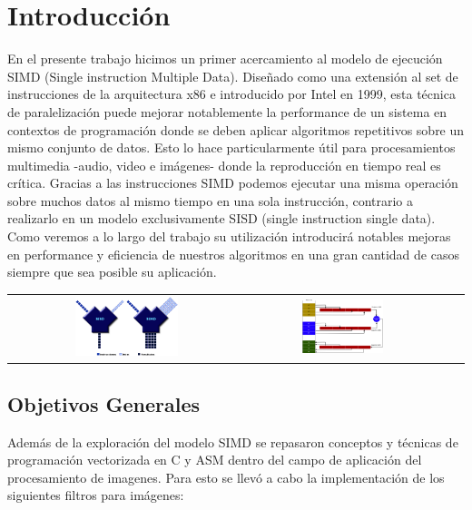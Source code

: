 \section{Introducción}
En el presente trabajo hicimos un primer acercamiento al modelo de ejecución SIMD (Single instruction Multiple Data). Diseñado como una extensión al set de instrucciones de la arquitectura x86 e introducido por Intel en 1999, esta técnica de paralelización puede mejorar notablemente la performance de un sistema en contextos de programación donde se deben aplicar algoritmos repetitivos sobre un mismo conjunto de datos. Esto lo hace particularmente útil para procesamientos multimedia -audio, video e imágenes- donde la reproducción en tiempo real es crítica. Gracias a las instrucciones SIMD podemos ejecutar una misma operación sobre muchos datos al mismo tiempo en una sola instrucción, contrario a realizarlo en un modelo exclusivamente SISD (single instruction single data). Como veremos a lo largo del trabajo su utilización introducirá notables mejoras en performance y eficiencia de nuestros algoritmos en una gran cantidad de casos siempre que sea posible su aplicación.

\begin{center}
  \begin{tabular}{cccc}
    \includegraphics[width=0.45\textwidth]{imagenes/sisdsimd.png} &
    \includegraphics[width=0.45\textwidth]{imagenes/registrossimd.png}\\
  \end{tabular}
 \end{center}

\subsection{Objetivos Generales}
Además de la exploración del modelo SIMD se repasaron conceptos y técnicas de programación vectorizada en C y ASM dentro del campo de aplicación del procesamiento de imagenes. Para esto se llevó a cabo la implementación de los siguientes filtros para imágenes:

